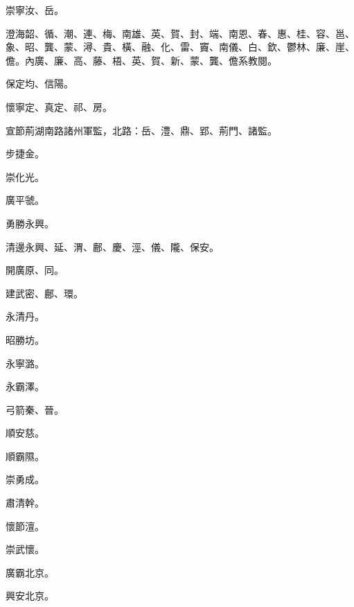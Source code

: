 \begin{pinyinscope}
 崇寧汝、岳。



 澄海韶、循、潮、連、梅、南雄、英、賀、封、端、南恩、春、惠、桂、容、邕、象、昭、龔、蒙、潯、貴、橫、融、化、雷、竇、南儀、白、欽、鬱林、廉、崖、儋。內廣、廉、高、藤、梧、英、賀、新、蒙、龔、儋系教閱。



 保定均、信陽。



 懷寧定、真定、祁、房。



 宣節荊湖南路諸州軍監，北路：岳、澧、鼎、郢、荊門、諸監。



 步捷金。



 崇化光。



 廣平虢。



 勇勝永興。



 清邊永興、延、渭、鄜、慶、涇、儀、隴、保安。



 開廣原、同。



 建武密、鄜、環。



 永清丹。



 昭勝坊。



 永寧潞。



 永霸澤。



 弓箭秦、晉。



 順安慈。



 順霸隰。



 崇勇成。



 肅清幹。



 懷節澶。



 崇武懷。



 廣霸北京。



 興安北京。




\end{pinyinscope}
